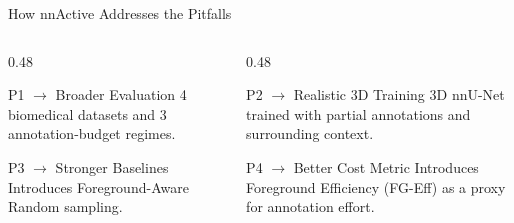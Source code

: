 \documentclass[aspectratio=169,11pt]{beamer}
\begin{document}
\begin{frame}{How nnActive Addresses the Pitfalls}

\begin{columns}[T]

\begin{column}{0.48\textwidth}

\begin{block}{P1 $\rightarrow$ Broader Evaluation}
\small
4 biomedical datasets and 3 annotation-budget regimes.
\end{block}

\vspace{0.25cm}

\begin{block}{P3 $\rightarrow$ Stronger Baselines}
\small
Introduces Foreground-Aware Random sampling.
\end{block}

\end{column}

\begin{column}{0.48\textwidth}

\begin{block}{P2 $\rightarrow$ Realistic 3D Training}
\small
3D nnU-Net trained with partial annotations and surrounding context.
\end{block}

\vspace{0.25cm}

\begin{block}{P4 $\rightarrow$ Better Cost Metric}
\small
Introduces Foreground Efficiency (FG-Eff) as a proxy for annotation effort.
\end{block}

\end{column}

\end{columns}

\vspace{0.35cm}


\end{frame}
\end{document}
